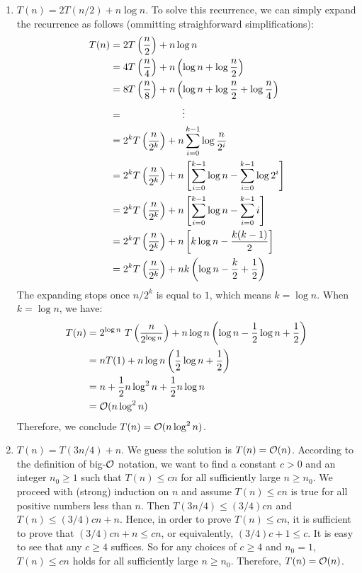 \documentclass{article}
\begin{document}
\begin{enumerate}[leftmargin={*}, font={\bf}, label={\arabic*.}, ref={\arabic*}]
\begin{enumerate}
      \item \label{qst:3c}
        $T(n) = 2T(n/2) + n\log n$. To solve this recurrence, we can simply expand the recurrence
        as follows (ommitting straighforward simplifications):
        \begin{align*}
          T(n) &= 2T\left(\frac{n}{2}\right) + n\log n \\
               &= 4T\left(\frac{n}{4}\right) + n\left(\log n + \log \frac{n}{2}\right) \\
               &= 8T\left(\frac{n}{8}\right) + n\left(\log n + \log \frac{n}{2} + \log \frac{n}{4}\right) \\
               &= \hspace{21mm}\vdots \\
               &= 2^kT\left(\frac{n}{2^k}\right) + n \sum_{i=0}^{k-1} \log \frac{n}{2^i} \\
               &= 2^kT\left(\frac{n}{2^k}\right) + n \left[\sum_{i=0}^{k-1} \log n - \sum_{i=0}^{k-1} \log 2^i\right] \\
               &= 2^kT\left(\frac{n}{2^k}\right) + n \left[\sum_{i=0}^{k-1} \log n - \sum_{i=0}^{k-1} i\right] \\
               &= 2^kT\left(\frac{n}{2^k}\right) + n \left[k\log n - \frac{k(k-1)}{2}\right] \\
               &= 2^kT\left(\frac{n}{2^k}\right) + nk\left(\log n - \frac{k}{2} + \frac{1}{2}\right)
        \end{align*}
        The expanding stops once $n/2^k$ is equal to $1$, which means $k = \log n$. When $k = \log
        n$, we have:
        \begin{align*}
          T(n) &= 2^{\log n}\ T\left(\frac{n}{2^{\log n}}\right) + n\log n\left(\log n - \frac{1}{2}\log n + \frac{1}{2}\right) \\
               &= nT(1) + n\log n \left(\frac{1}{2}\log n + \frac{1}{2}\right) \\
               &= n + \frac{1}{2}n\log^2 n  + \frac{1}{2} n\log n \\
               &= \operatorname*{\mathcal{O}}(n\log^2 n)
        \end{align*}
        Therefore, we conclude $T(n) = \operatorname*{\mathcal{O}}(n\log^2 n)$.

      \item \label{qst:3d}
        $T(n) = T(3n/4) + n$. We guess the solution is $T(n) = \operatorname*{\mathcal{O}}(n)$. According to the definition
        of big-$\operatorname*{\mathcal{O}}$ notation, we want to find a constant $c > 0$ and an integer $n_0 \geq 1$ such
        that $T(n) \leq cn$ for all sufficiently large $n \geq n_0$. We proceed with (strong)
        induction on $n$ and assume $T(n) \leq cn$ is true for all positive numbers less than $n$.
        Then $T(3n/4) \leq (3/4)cn$ and $T(n) \leq (3/4) cn + n$. Hence, in order to prove $T(n)
        \leq cn$, it is sufficient to prove that $(3/4)cn + n \leq cn$, or equivalently, $(3/4)c +
        1 \leq c$. It is easy to see that any $c \geq 4$ suffices. So for any choices of $c \geq 
        4$ and $n_0 = 1$, $T(n) \leq cn$ holds for all sufficiently large $n \geq n_0$. Therefore,
        $T(n) = \operatorname*{\mathcal{O}}(n)$.
    \end{enumerate}


\end{enumerate}
\end{document}
